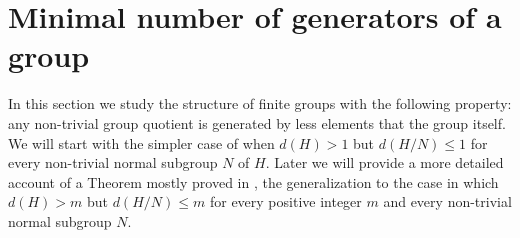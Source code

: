 \chapter{Minimal number of generators of a group}

In this section we study the structure of finite groups with the following property: any non-trivial group quotient is generated by less elements that the group itself. 
We will start with the simpler case of when $d(H) > 1$ but $d(H/N) \le 1$ for every non-trivial normal subgroup $N$ of $H$. 
Later we will provide a more detailed account of a Theorem mostly proved in \cite{DallaVoltaFGNMGAPQ}, the generalization to the case in which $d(H) > m$ but $d(H/N) \le m$ for every positive integer $m$ and every non-trivial normal subgroup $N$.



